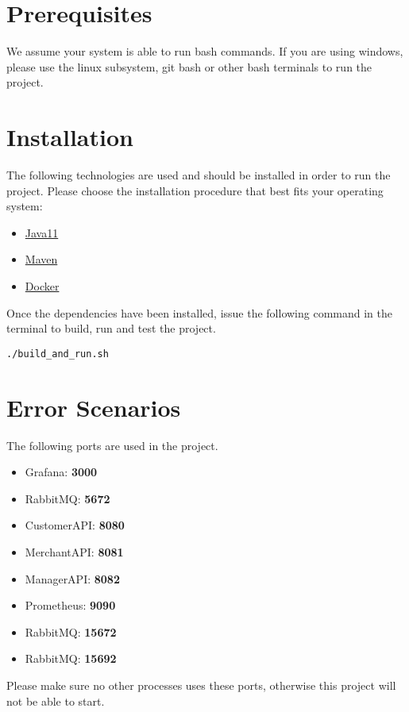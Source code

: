 \documentclass[12pt]{article}
\newcommand{\port}[1]{\textbf{#1}}
\begin{document}
\section{Prerequisites}
We assume your system is able to run bash commands. If you are using windows, please use the linux subsystem, git bash or other bash terminals to run the project.


\section{Installation}
The following technologies are used and should be installed in order to run the project. Please choose the installation procedure that best fits your operating system:

\begin{itemize}
	\item{\href{https://www.oracle.com/java/technologies/downloads/#java11}{Java11}}
	\item{\href{https://maven.apache.org/install.html}{Maven}}
	\item{\href{https://docs.docker.com/get-docker/}{Docker}}
\end{itemize}

Once the dependencies have been installed, issue the following command in the terminal to build, run and test the project.

\begin{lstlisting}
./build_and_run.sh
\end{lstlisting}


\section{Error Scenarios}
The following ports are used in the project.
\begin{itemize}
	\item{Grafana: \port{3000}}
	\item{RabbitMQ: \port{5672}}
	\item{CustomerAPI: \port{8080}}
	\item{MerchantAPI: \port{8081}}
	\item{ManagerAPI: \port{8082}}
	\item{Prometheus: \port{9090}}
	\item{RabbitMQ: \port{15672}}
	\item{RabbitMQ: \port{15692}}
\end{itemize}

Please make sure no other processes uses these ports, otherwise this project will not be able to start.
\end{document}
